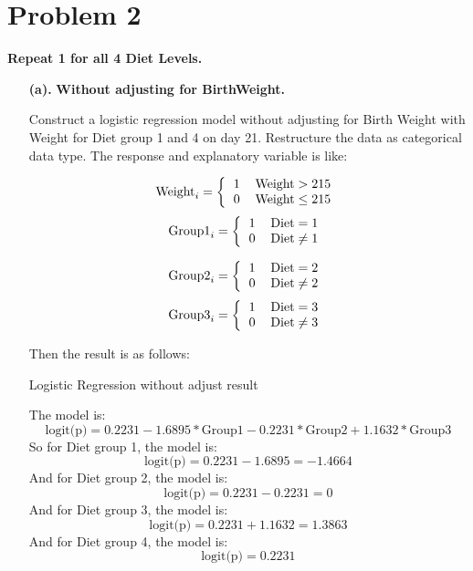 \documentclass[10pt,letterpaper]{article}
\begin{document}
\section*{Problem 2}
\textbf{Repeat 1 for all 4 Diet Levels.}
\begin{enumerate}[leftmargin=0cm,itemindent=.5cm,labelwidth=\itemindent,labelsep=0cm,align=left]
\item[\textbf{(a).} ] \textbf{Without adjusting for BirthWeight.}

Construct a logistic regression model without adjusting for Birth Weight with Weight for Diet group 1 and 4 on day 21. Restructure the data as categorical data type. The response and explanatory variable is like:\\
\begin{multicols}{2}
\[\text{Weight}_i=  
\left \{
  \begin{tabular}{cc}
  1 & $\text{Weight}>215$\\
  0 & $\text{Weight} \leq 215$ \\
  \end{tabular}
\right.
\]
\[\text{Group1}_i=  
\left \{
  \begin{tabular}{cc}
  1 &  $\text{Diet} = 1$\\
  0 &  $\text{Diet} \neq 1$\\
  \end{tabular}
\right.
\]

\[\text{Group2}_i=  
\left \{
  \begin{tabular}{cc}
  1 &  $\text{Diet} = 2$\\
  0 &  $\text{Diet} \neq 2$\\
  \end{tabular}
\right.
\]
\[\text{Group3}_i=  
\left \{
  \begin{tabular}{cc}
  1 &  $\text{Diet} = 3$\\
  0 &  $\text{Diet} \neq 3$ \\
  \end{tabular}
\right.
\]
\end{multicols}
Then the result is as follows:
\begin{center}
Logistic Regression without adjust result

\end{center}
The model is:
\[ \text{logit(p)} = 0.2231-1.6895*\text{Group1}-0.2231*\text{Group2}+1.1632*\text{Group3}\]
So for Diet group 1, the model is:
\[ \text{logit(p)} = 0.2231-1.6895=-1.4664\]
And for Diet group 2, the model is:
\[\text{logit(p)} = 0.2231-0.2231=0\]
And for Diet group 3, the model is:
\[\text{logit(p)} = 0.2231+1.1632=1.3863\]
And for Diet group 4, the model is:
\[\text{logit(p)} = 0.2231\]


\end{enumerate}
\end{document}
